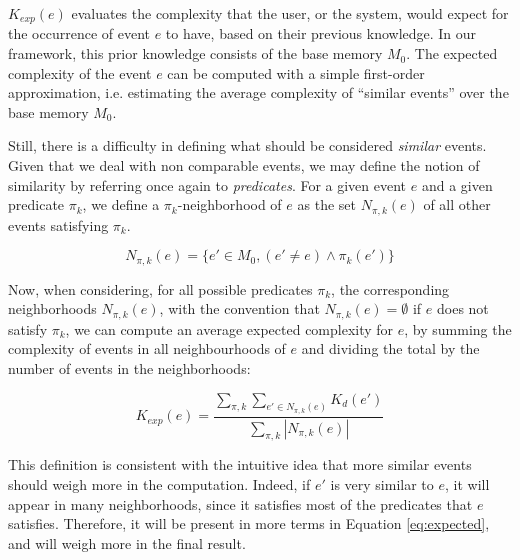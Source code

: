 \documentclass[entropy,article,submit,moreauthors,pdftex]{Definitions/mdpi}
\begin{document}
$K_{exp}(e)$ evaluates the complexity that the user, or the system, would expect for the occurrence of event $e$ to have, based on their previous knowledge. In our framework, this prior knowledge consists of the base memory $M_0$. The expected complexity of the event $e$ can be computed with a simple first-order approximation, i.e. estimating the average complexity of ``similar events'' over the base memory $M_0$.

Still, there is a difficulty in defining what
should be considered \emph{similar} events. Given that we deal with non comparable events, we may define the notion of similarity by referring once again to \emph{predicates}. For a given event $e$ and a given predicate $\pi_k$, we define a $\pi_k$-neighborhood of $e$ as the set $N_{\pi, k}(e)$ of all other events satisfying $\pi_k$.

\begin{equation}
    \label{eq:similar}
    N_{\pi, k}(e) = \{e'\in M_0, (e' \neq e) \wedge \pi_k(e')\}
\end{equation}

Now, when considering, for all possible predicates $\pi_k$, the corresponding
neighborhoods $N_{\pi, k}(e)$, with the convention that $N_{\pi, k}(e) = \emptyset$
if $e$ does not satisfy $\pi_k$, we can compute an average expected complexity for $e$, by summing the complexity of events in all neighbourhoods of $e$ and dividing the total by the number of events in the neighborhoods:

\begin{equation}
    \label{eq:expected}
    K_{exp}(e) = \frac{
    \sum_{\pi, k} \sum_{e' \in N_{\pi, k}(e)} K_d(e')
    }{
    \sum_{\pi, k} |N_{\pi, k}(e)|
    }
\end{equation}

This definition is consistent with the intuitive idea that more similar events should weigh more in the computation. Indeed, if $e'$
is very similar to $e$, it will appear in many neighborhoods, since it
satisfies most of the predicates that $e$ satisfies. Therefore, it will
be present in more terms in Equation \ref{eq:expected}, and will weigh more in
the final result.
\end{document}
